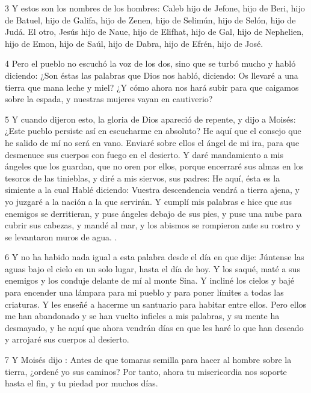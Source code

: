 \par 3 Y estos son los nombres de los hombres: Caleb hijo de Jefone, hijo de Beri, hijo de Batuel, hijo de Galifa, hijo de Zenen, hijo de Selimún, hijo de Selón, hijo de Judá. El otro, Jesús hijo de Naue, hijo de Elifhat, hijo de Gal, hijo de Nephelien, hijo de Emon, hijo de Saúl, hijo de Dabra, hijo de Efrén, hijo de José.

\par 4 Pero el pueblo no escuchó la voz de los dos, sino que se turbó mucho y habló diciendo: ¿Son éstas las palabras que Dios nos habló, diciendo: Os llevaré a una tierra que mana leche y miel? ¿Y cómo ahora nos hará subir para que caigamos sobre la espada, y nuestras mujeres vayan en cautiverio?

\par 5 Y cuando dijeron esto, la gloria de Dios apareció de repente, y dijo a Moisés: ¿Este pueblo persiste así en escucharme en absoluto? He aquí que el consejo que he salido de mí no será en vano. Enviaré sobre ellos el ángel de mi ira, para que desmenuce sus cuerpos con fuego en el desierto. Y daré mandamiento a mis ángeles que los guardan, que no oren por ellos, porque encerraré sus almas en los tesoros de las tinieblas, y diré a mis siervos, sus padres: He aquí, ésta es la simiente a la cual Hablé diciendo: Vuestra descendencia vendrá a tierra ajena, y yo juzgaré a la nación a la que servirán. Y cumplí mis palabras e hice que sus enemigos se derritieran, y puse ángeles debajo de sus pies, y puse una nube para cubrir sus cabezas, y mandé al mar, y los abismos se rompieron ante su rostro y se levantaron muros de agua. .

\par 6 Y no ha habido nada igual a esta palabra desde el día en que dije: Júntense las aguas bajo el cielo en un solo lugar, hasta el día de hoy. Y los saqué, maté a sus enemigos y los conduje delante de mí al monte Sina. Y incliné los cielos y bajé para encender una lámpara para mi pueblo y para poner límites a todas las criaturas. Y les enseñé a hacerme un santuario para habitar entre ellos. Pero ellos me han abandonado y se han vuelto infieles a mis palabras, y su mente ha desmayado, y he aquí que ahora vendrán días en que les haré lo que han deseado y arrojaré sus cuerpos al desierto.

\par 7 Y Moisés dijo : Antes de que tomaras semilla para hacer al hombre sobre la tierra, ¿ordené yo sus caminos? Por tanto, ahora tu misericordia nos soporte hasta el fin, y tu piedad por muchos días.

